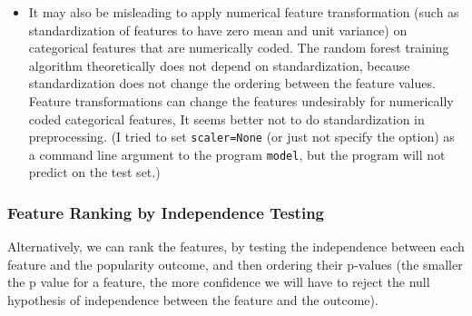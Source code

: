 \documentclass[final, 12pt]{elsarticle}
\begin{document}
\begin{itemize}


\item It may also be misleading to apply numerical feature transformation (such as standardization of features  to have zero mean and unit variance) on  categorical features that are numerically coded.
The random forest training algorithm theoretically does not depend on standardization, because standardization does not change the ordering between the feature values.
Feature transformations can change the features undesirably for numerically coded categorical features, %
It seems better not to do standardization in preprocessing. (I tried to set  \verb|scaler=None| (or just not specify the option) as a command line argument to the program \verb|model|, but the program will not predict on the test set.)

\end{itemize}








\subsubsection{Feature Ranking by Independence Testing}

Alternatively, we can rank the features, by testing the independence between each feature and the popularity outcome, and then ordering their p-values (the smaller the p value for a feature, the more confidence we will have to reject the null hypothesis of independence between the feature and the outcome).
\end{document}
